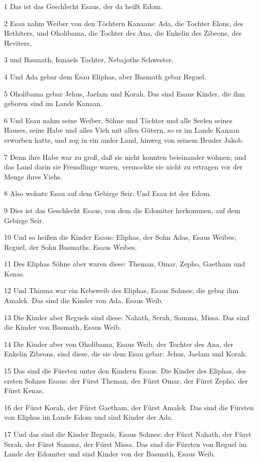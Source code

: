 \par 1 Das ist das Geschlecht Esaus, der da heißt Edom.
\par 2 Esau nahm Weiber von den Töchtern Kanaans: Ada, die Tochter Elons, des Hethiters, und Oholibama, die Tochter des Ana, die Enkelin des Zibeons, des Heviters,
\par 3 und Basmath, Ismaels Tochter, Nebajoths Schwester.
\par 4 Und Ada gebar dem Esau Eliphas, aber Basmath gebar Reguel.
\par 5 Oholibama gebar Jehus, Jaelam und Korah. Das sind Esaus Kinder, die ihm geboren sind im Lande Kanaan.
\par 6 Und Esau nahm seine Weiber, Söhne und Töchter und alle Seelen seines Hauses, seine Habe und alles Vieh mit allen Gütern, so er im Lande Kanaan erworben hatte, und zog in ein ander Land, hinweg von seinem Bruder Jakob.
\par 7 Denn ihre Habe war zu groß, daß sie nicht konnten beieinander wohnen; und das Land darin sie Fremdlinge waren, vermochte sie nicht zu ertragen vor der Menge ihres Viehs.
\par 8 Also wohnte Esau auf dem Gebirge Seir. Und Esau ist der Edom.
\par 9 Dies ist das Geschlecht Esaus, von dem die Edomiter herkommen, auf dem Gebirge Seir.
\par 10 Und so heißen die Kinder Esaus: Eliphas, der Sohn Adas, Esaus Weibes; Reguel, der Sohn Basmaths, Esaus Weibes.
\par 11 Des Eliphas Söhne aber waren diese: Theman, Omar, Zepho, Gaetham und Kenas.
\par 12 Und Thimna war ein Kebsweib des Eliphas, Esaus Sohnes; die gebar ihm Amalek. Das sind die Kinder von Ada, Esaus Weib.
\par 13 Die Kinder aber Reguels sind diese: Nahath, Serah, Samma, Missa. Das sind die Kinder von Basmath, Esaus Weib.
\par 14 Die Kinder aber von Oholibama, Esaus Weib, der Tochter des Ana, der Enkelin Zibeons, sind diese, die sie dem Esau gebar: Jehus, Jaelam und Korah.
\par 15 Das sind die Fürsten unter den Kindern Esaus. Die Kinder des Eliphas, des ersten Sohnes Esaus: der Fürst Theman, der Fürst Omar, der Fürst Zepho, der Fürst Kenas,
\par 16 der Fürst Korah, der Fürst Gaetham, der Fürst Amalek. Das sind die Fürsten von Eliphas im Lande Edom und sind Kinder der Ada.
\par 17 Und das sind die Kinder Reguels, Esaus Sohnes: der Fürst Nahath, der Fürst Serah, der Fürst Samma, der Fürst Missa. Das sind die Fürsten von Reguel im Lande der Edomiter und sind Kinder von der Basmath, Esaus Weib.
